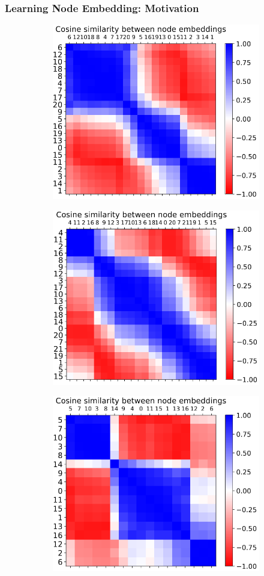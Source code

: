 \documentclass{beamer}
\begin{document}
\begin{frame}
\end{frame}

\begin{frame}
    \frametitle{Learning Node Embedding: Motivation}

    \begin{figure}
        \begin{subfigure}{0.5\linewidth}
            \centering
            \includegraphics[height=0.53\textwidth]{emb1.png}
        \end{subfigure}
        \begin{subfigure}{0.49\linewidth}
            \centering
            \includegraphics[height=0.53\textwidth]{emb2.png}
        \end{subfigure}
        \begin{subfigure}{0.5\linewidth}
            \centering
            \includegraphics[height=0.53\textwidth]{emb3.png}

\end{subfigure}
\end{figure}
\end{frame}
\end{document}
